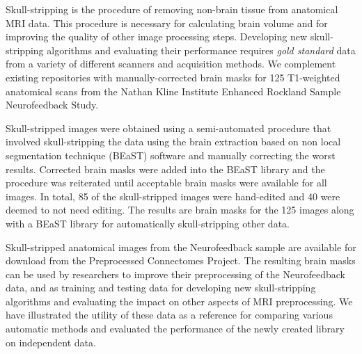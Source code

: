 Skull-stripping is the procedure of removing non-brain tissue from anatomical MRI data. This procedure is necessary for calculating brain volume and for improving the quality of other image processing steps. Developing new skull-stripping algorithms and evaluating their performance requires \emph{gold standard} data from a variety of different scanners and acquisition methods. We complement existing repositories with manually-corrected brain masks for 125 T1-weighted anatomical scans from the Nathan Kline Institute Enhanced Rockland Sample Neurofeedback Study.

Skull-stripped images were obtained using a semi-automated procedure that involved skull-stripping the data using the brain extraction based on non local segmentation technique (BEaST) software and manually correcting the worst results. Corrected brain masks were added into the BEaST library and the procedure was reiterated until acceptable brain masks were available for all images. In total, 85 of the skull-stripped images were hand-edited and 40 were deemed to not need editing. The results are brain masks for the 125 images along with a BEaST library for automatically skull-stripping other data.


Skull-stripped anatomical images from the Neurofeedback sample are available for download from the Preprocessed Connectomes Project. The resulting brain masks can be used by researchers to improve their preprocessing of the Neurofeedback data, and as training and testing data for developing new skull-stripping algorithms and evaluating the impact on other aspects of MRI preprocessing. We have illustrated the utility of these data as a reference for comparing various automatic methods and evaluated the performance of the newly created library on independent data.
